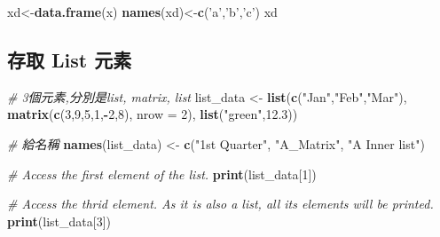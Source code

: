 \documentclass[]{book}
\newenvironment{Shaded}{\begin{snugshade}}{\end{snugshade}}
\newcommand{\KeywordTok}[1]{\textcolor[rgb]{0.13,0.29,0.53}{\textbf{#1}}}
\newcommand{\DataTypeTok}[1]{\textcolor[rgb]{0.13,0.29,0.53}{#1}}
\newcommand{\DecValTok}[1]{\textcolor[rgb]{0.00,0.00,0.81}{#1}}
\newcommand{\FloatTok}[1]{\textcolor[rgb]{0.00,0.00,0.81}{#1}}
\newcommand{\StringTok}[1]{\textcolor[rgb]{0.31,0.60,0.02}{#1}}
\newcommand{\CommentTok}[1]{\textcolor[rgb]{0.56,0.35,0.01}{\textit{#1}}}
\newcommand{\OperatorTok}[1]{\textcolor[rgb]{0.81,0.36,0.00}{\textbf{#1}}}
\newcommand{\NormalTok}[1]{#1}
\theoremstyle{definition}
\theoremstyle{definition}
\theoremstyle{definition}
\theoremstyle{remark}
\begin{document}
\begin{Shaded}
\begin{Highlighting}[]
\NormalTok{xd<-}\KeywordTok{data.frame}\NormalTok{(x)}
\KeywordTok{names}\NormalTok{(xd)<-}\KeywordTok{c}\NormalTok{(}\StringTok{'a'}\NormalTok{,}\StringTok{'b'}\NormalTok{,}\StringTok{'c'}\NormalTok{)}
\NormalTok{xd}
\end{Highlighting}
\end{Shaded}

\subsection{存取 List 元素}\label{-list-}

\begin{Shaded}
\begin{Highlighting}[]
\CommentTok{# 3個元素,分別是list, matrix, list}
\NormalTok{list_data <-}\StringTok{ }\KeywordTok{list}\NormalTok{(}\KeywordTok{c}\NormalTok{(}\StringTok{"Jan"}\NormalTok{,}\StringTok{"Feb"}\NormalTok{,}\StringTok{"Mar"}\NormalTok{), }\KeywordTok{matrix}\NormalTok{(}\KeywordTok{c}\NormalTok{(}\DecValTok{3}\NormalTok{,}\DecValTok{9}\NormalTok{,}\DecValTok{5}\NormalTok{,}\DecValTok{1}\NormalTok{,}\OperatorTok{-}\DecValTok{2}\NormalTok{,}\DecValTok{8}\NormalTok{), }\DataTypeTok{nrow =} \DecValTok{2}\NormalTok{),}
   \KeywordTok{list}\NormalTok{(}\StringTok{"green"}\NormalTok{,}\FloatTok{12.3}\NormalTok{))}

\CommentTok{# 給名稱}
\KeywordTok{names}\NormalTok{(list_data) <-}\StringTok{ }\KeywordTok{c}\NormalTok{(}\StringTok{"1st Quarter"}\NormalTok{, }\StringTok{"A_Matrix"}\NormalTok{, }\StringTok{"A Inner list"}\NormalTok{)}

\CommentTok{# Access the first element of the list.}
\KeywordTok{print}\NormalTok{(list_data[}\DecValTok{1}\NormalTok{])}
\end{Highlighting}
\end{Shaded}

\begin{Shaded}
\begin{Highlighting}[]
\CommentTok{# Access the thrid element. As it is also a list, all its elements will be printed.}
\KeywordTok{print}\NormalTok{(list_data[}\DecValTok{3}\NormalTok{])}
\end{Highlighting}
\end{Shaded}

\begin{Shaded}
\end{Shaded}
\end{document}
